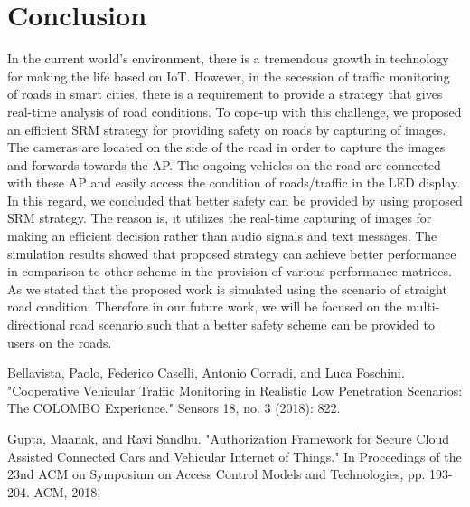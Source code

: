 \documentclass[journal,transmag]{IEEEtran}
\begin{document}
    \section {Conclusion}
    In the current world's environment, there is a tremendous growth in technology for making the life based on IoT. However, in the secession of traffic monitoring of roads in smart cities, there is a requirement to provide a strategy that gives real-time analysis of road conditions. To cope-up with this challenge, we proposed an efficient SRM strategy for providing safety on roads by capturing of images. The cameras are located on the side of the road in order to capture the images and forwards towards the AP. The ongoing vehicles on the road are connected with these AP and easily access the condition of roads/traffic in the LED display. In this regard, we concluded that better safety can be provided by using proposed SRM strategy. The reason is, it utilizes the real-time capturing of images for making an efficient decision rather than audio signals and text messages. The simulation results showed that proposed strategy can achieve better performance in comparison to other scheme in the provision of various performance matrices. As we stated that the proposed work is simulated using the scenario of straight road condition. Therefore in our future work, we will be focused on the multi-directional road scenario such that a better safety scheme can be provided to users on the roads.
	
  
  
  
\begin{thebibliography}{00}
	
	
	
	
Bellavista, Paolo, Federico Caselli, Antonio Corradi, and Luca Foschini. "Cooperative Vehicular Traffic Monitoring in Realistic Low Penetration Scenarios: The COLOMBO Experience." Sensors 18, no. 3 (2018): 822.
	
	
	Gupta, Maanak, and Ravi Sandhu. "Authorization Framework for Secure Cloud Assisted Connected Cars and Vehicular Internet of Things." In Proceedings of the 23nd ACM on Symposium on Access Control Models and Technologies, pp. 193-204. ACM, 2018.
	
\end{thebibliography}


	
\end{document}
